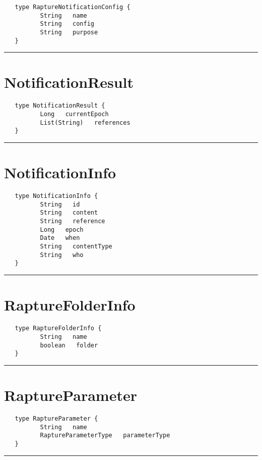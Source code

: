 \begin{Verbatim}
   type RaptureNotificationConfig {
          String   name
          String   config
          String   purpose
   }
\end{Verbatim}

\rule{12cm}{2pt}
\section{NotificationResult}
\label{type:NotificationResult}

\begin{Verbatim}
   type NotificationResult {
          Long   currentEpoch
          List(String)   references
   }
\end{Verbatim}

\rule{12cm}{2pt}
\section{NotificationInfo}
\label{type:NotificationInfo}

\begin{Verbatim}
   type NotificationInfo {
          String   id
          String   content
          String   reference
          Long   epoch
          Date   when
          String   contentType
          String   who
   }
\end{Verbatim}

\rule{12cm}{2pt}
\section{RaptureFolderInfo}
\label{type:RaptureFolderInfo}

\begin{Verbatim}
   type RaptureFolderInfo {
          String   name
          boolean   folder
   }
\end{Verbatim}

\rule{12cm}{2pt}
\section{RaptureParameter}
\label{type:RaptureParameter}

\begin{Verbatim}
   type RaptureParameter {
          String   name
          RaptureParameterType   parameterType
   }
\end{Verbatim}

\rule{12cm}{2pt}
